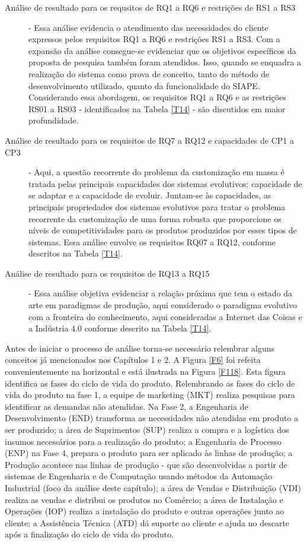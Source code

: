 \documentclass[10pt,letterpaper,twocolumn]{IEEEtran}
\begin{document}
\begin{description}
	\item[Análise de resultado para os requsitos de RQ1 a RQ6 e restrições de RS1 a RS3] -
	Essa análise evidencia o atendimento das necessidades do cliente expressos pelos requisitos RQ1 a RQ6 e 
	restrições RS1 a RS3. Com a expansão da análise consegue-se evidenciar que os objetivos específicos da 
	proposta de pesquisa também foram atendidos. Isso,  quando se  enquadra a realização do sistema  como 
	prova de conceito, tanto do método de desenvolvimento utilizado, quanto da funcionalidade do 
	SIAPE. Considerando essa abordagem, os requisitos RQ1 a RQ6 e as restrições RS01 a RS03 - identificados 
	na Tabela \ref{T14} - são discutidos em maior profundidade.\par
	
	\item[Análise de resultado para os requisitos de RQ7 a RQ12 e capacidades de CP1 a CP3] -
	Aqui, a questão recorrente do problema da customização em massa é tratada pelas principais capacidades 
	dos sistemas evolutivos: capacidade de se adaptar e a capacidade de evoluir. Juntam-se às capacidades, 
	as principais propriedades dos sistemas evolutivos para tratar o problema recorrente da customização 
	de uma forma robusta que proporcione os níveis de competitividades para os produtos produzidos por esses
	tipos de sistemas. Essa análise envolve os requisitos RQ07 a RQ12, conforme descritos na Tabela \ref{T14}.
	
	\item[Análise de resultado para os requisitos de RQ13 a RQ15] -
	Essa análise objetiva evidenciar a relação próxima que tem o estado da arte em paradigmas de produção, 
	aqui considerado o paradigma evolutivo com a fronteira do conhecimento, aqui consideradas a Internet das 
	Coisas e a Indústria 4.0 conforme descrito na Tabela \ref{T14}. 
\end{description} 

Antes de iniciar o processo de análise torna-se necessário relembrar alguns conceitos já mencionados nos 
Capítulos 1 e 2. A Figura \ref{F6} foi refeita convenientemente na horizontal e está ilustrada na
Figura \ref{F118}. Esta figura identifica as fases do ciclo de vida do produto. Relembrando as fases 
do ciclo de vida do produto na fase 1, a equipe de marketing (MKT) realiza pesquisas para identificar 
as demandas não atendidas. Na Fase 2, a Engenharia de Desenvolvimento (END) transforma as necessidades 
não atendidas em produto a ser produzido; a área de Suprimentos (SUP) realiza a compra e a logística 
dos insumos necessários para a realização do produto; a Engenharia de Processo (ENP) na Fase 4, prepara 
o produto para ser aplicado às linhas de produção; a Produção acontece nas linhas de produção - que são 
desenvolvidas a partir de sistemas  de Engenharia e de Computação usando métodos da Automação Industrial 
(foco da análise deste capítulo); a área de Vendas e Distribuição (VDI) realiza as vendas e distribui os 
produtos no Comércio; a área de Instalação e Operações (IOP) realiza a instalação do produto e outras 
operações junto ao cliente;  a Assistência Técnica (ATD) dá suporte ao cliente e ajuda no descarte após 
a finalização do ciclo de vida do produto.  
\end{document}
